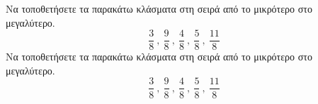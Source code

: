 Να τοποθετήσετε τα παρακάτω κλάσματα στη σειρά από το μικρότερο στο μεγαλύτερο.
\[ \frac{3}{8}\ ,\ \frac{9}{8}\ ,\ \frac{4}{8}\ ,\ \frac{5}{8}\ ,\ \dfrac{11}{8} \]
Να τοποθετήσετε τα παρακάτω κλάσματα στη σειρά από το μικρότερο στο μεγαλύτερο.
\[ \frac{3}{8}\ ,\ \frac{9}{8}\ ,\ \frac{4}{8}\ ,\ \frac{5}{8}\ ,\ \dfrac{11}{8} \]
